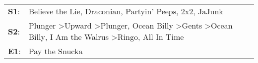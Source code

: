\begin{supertabular}{p{0.03\textwidth}p{0.92\textwidth}}
 \textbf{S1}:  &                                                                                                                                                                                                                 Believe the Lie\textsuperscript{}, \enspace Draconian\textsuperscript{}, \enspace Partyin' Peeps\textsuperscript{}, \enspace 2x2\textsuperscript{}, \enspace JaJunk\textsuperscript{}  \enspace  \\
 \textbf{S2}:  &  Plunger\textsuperscript{} \textgreater \enspace Upward\textsuperscript{} \textgreater \enspace Plunger\textsuperscript{}, \enspace Ocean Billy\textsuperscript{} \textgreater \enspace Gents\textsuperscript{} \textgreater \enspace Ocean Billy\textsuperscript{}, \enspace I Am the Walrus\textsuperscript{} \textgreater \enspace Ringo\textsuperscript{}, \enspace All In Time\textsuperscript{}  \enspace  \\
 \textbf{E1}:  &                                                                                                                                                                                                                                                                                                                                                                      Pay the Snucka\textsuperscript{}  \enspace  \\
\end{supertabular}
